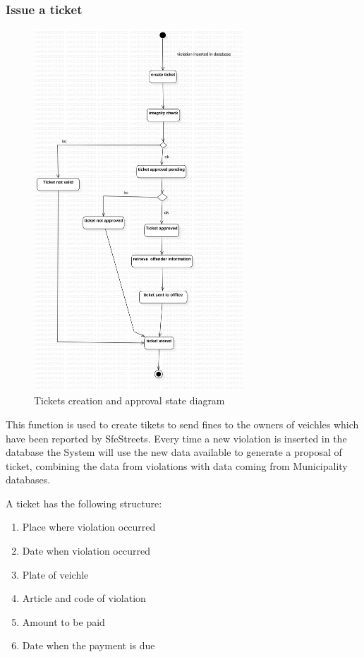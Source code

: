 \subsubsection{Issue a ticket}

\begin{figure}
\centering
\includegraphics[width=0.7\textwidth]{Images/ticketstate.png}
\caption{\label{fig:ticketstatediag} Tickets creation and approval state diagram}
\end{figure}

This function is used to create tikets to send fines to the owners of veichles which have been reported by SfeStreets.
Every time a new violation is inserted in the database the System will use the new data available to generate a proposal of ticket, combining the data from violations with data coming from Municipality databases.

A ticket has the following structure:
\begin{enumerate}
  \item Place where violation occurred
  \item Date when violation occurred
  \item Plate of veichle
  \item Article and code of violation
  \item Amount to be paid
  \item Date when the payment is due
\end{enumerate}

